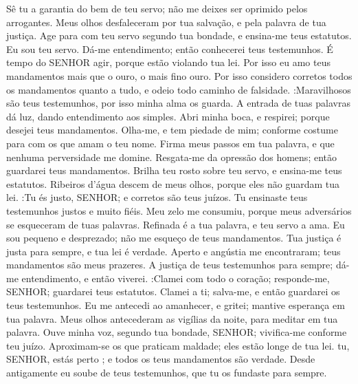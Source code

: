 {  Sê tu a garantia do bem de teu servo; não me deixes ser oprimido pelos arrogantes.
  Meus olhos desfaleceram
{} por tua salvação, e pela palavra de tua justiça.
  Age para com teu servo segundo tua bondade, e ensina-me teus estatutos.
  Eu sou teu servo. Dá-me entendimento; então conhecerei teus testemunhos.
  É tempo do SENHOR agir, porque estão violando tua lei.
  Por isso eu amo teus mandamentos mais que o ouro, o mais fino ouro.
  Por isso considero corretos todos os
{} mandamentos quanto a tudo, e odeio todo caminho de falsidade.
   :Maravilhosos são teus testemunhos, por isso minha alma os guarda.
  A entrada de tuas palavras dá luz, dando entendimento aos simples.
  Abri minha boca, e respirei; porque desejei teus mandamentos.
  Olha-me, e tem piedade de mim; conforme
{} costume para com os que amam o teu nome.
  Firma meus passos em tua palavra, e que nenhuma perversidade me domine.
  Resgata-me da opressão dos homens; então guardarei teus mandamentos.
  Brilha teu rosto sobre teu servo, e ensina-me teus estatutos.
  Ribeiros d'água descem de meus olhos, porque eles não guardam tua lei.
   :Tu és justo, SENHOR; e corretos são teus juízos.
  Tu ensinaste teus testemunhos justos e muito fiéis.
  Meu zelo me consumiu, porque meus adversários se esqueceram de tuas palavras.
  Refinada é a tua palavra, e teu servo a ama.
  Eu sou pequeno e desprezado;
{} não me esqueço de teus mandamentos.
  Tua justiça é justa para sempre, e tua lei é verdade.
  Aperto e angústia me encontraram;
{} teus mandamentos são meus prazeres.
  A justiça de teus testemunhos
{} para sempre; dá-me entendimento, e então viverei.
   :Clamei com todo o
{} coração; responde-me, SENHOR; guardarei teus estatutos.
  Clamei a ti; salva-me, e então guardarei os teus testemunhos.
  Eu me antecedi ao amanhecer, e gritei;
{} mantive esperança em tua palavra.
  Meus olhos antecederam as vigílias da noite, para meditar em tua palavra.
  Ouve minha voz, segundo tua bondade, SENHOR; vivifica-me conforme teu juízo.
  Aproximam-se
{} os que praticam maldade; eles estão longe de tua lei.
   tu, SENHOR, estás perto
{} ; e todos os teus mandamentos são verdade.
  Desde antigamente eu soube de teus testemunhos, que tu os fundaste para sempre.
}
